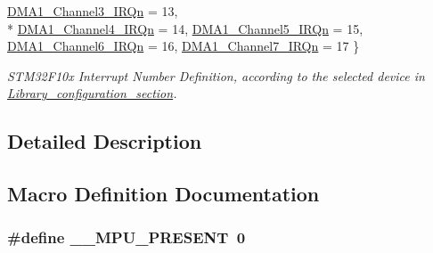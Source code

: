 \begin{DoxyCompactItemize}
\hyperlink{group___configuration__section__for___c_m_s_i_s_gga666eb0caeb12ec0e281415592ae89083a3d575a484e3cb668a42e6f9074112d23}{D\+M\+A1\+\_\+\+Channel3\+\_\+\+I\+R\+Qn} = 13, 
\\*
\hyperlink{group___configuration__section__for___c_m_s_i_s_gga666eb0caeb12ec0e281415592ae89083ae36905d55d7cbb8ffb2de44c9b88bb31}{D\+M\+A1\+\_\+\+Channel4\+\_\+\+I\+R\+Qn} = 14, 
\hyperlink{group___configuration__section__for___c_m_s_i_s_gga666eb0caeb12ec0e281415592ae89083abf98e4379328f74686524faa05bf6177}{D\+M\+A1\+\_\+\+Channel5\+\_\+\+I\+R\+Qn} = 15, 
\hyperlink{group___configuration__section__for___c_m_s_i_s_gga666eb0caeb12ec0e281415592ae89083aab3710849c919f2327eaa001d9e2a7a0}{D\+M\+A1\+\_\+\+Channel6\+\_\+\+I\+R\+Qn} = 16, 
\hyperlink{group___configuration__section__for___c_m_s_i_s_gga666eb0caeb12ec0e281415592ae89083a6617c3c1d75470b8bfcc48f82ff38fd1}{D\+M\+A1\+\_\+\+Channel7\+\_\+\+I\+R\+Qn} = 17
 \}\begin{DoxyCompactList}\small\item\em S\+T\+M32\+F10x Interrupt Number Definition, according to the selected device in \hyperlink{group___library__configuration__section}{Library\+\_\+configuration\+\_\+section}. \end{DoxyCompactList}
\end{DoxyCompactItemize}


\subsection{Detailed Description}


\subsection{Macro Definition Documentation}
\subsubsection[{\texorpdfstring{\+\_\+\+\_\+\+M\+P\+U\+\_\+\+P\+R\+E\+S\+E\+NT}{__MPU_PRESENT}}]{\setlength{\rightskip}{0pt plus 5cm}\#define \+\_\+\+\_\+\+M\+P\+U\+\_\+\+P\+R\+E\+S\+E\+NT~0}\hypertarget{group___configuration__section__for___c_m_s_i_s_ga4127d1b31aaf336fab3d7329d117f448}{}\label{group___configuration__section__for___c_m_s_i_s_ga4127d1b31aaf336fab3d7329d117f448}


